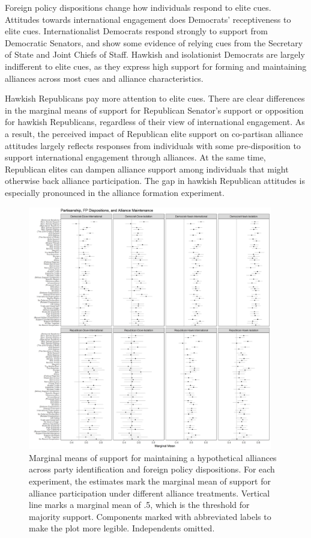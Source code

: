 \documentclass[12pt]{article}
\begin{document}
Foreign policy dispositions change how individuals respond to elite cues. 
Attitudes towards international engagement does Democrats' receptiveness to elite cues. 
Internationalist Democrats respond strongly to support from Democratic Senators, and show some evidence of relying cues from the Secretary of State and Joint Chiefs of Staff. 
Hawkish and isolationist Democrats are largely indifferent to elite cues, as they express high support for forming and maintaining alliances across most cues and alliance characteristics. 


Hawkish Republicans pay more attention to elite cues. 
There are clear differences in the marginal means of support for Republican Senator's support or opposition for hawkish Republicans, regardless of their view of international engagement. 
As a result, the perceived impact of Republican elite support on co-partisan alliance attitudes largely reflects responses from individuals with some pre-disposition to support international engagement through alliances. 
At the same time, Republican elites can dampen alliance support among individuals that might otherwise back alliance participation.
The gap in hawkish Republican attitudes is especially pronounced in the alliance formation experiment. 



\begin{figure}
	\centering
		\includegraphics[width=0.95\textwidth]{../figures/party-dispo-main.png}
	\caption{Marginal means of support for maintaining a hypothetical alliances across party identification and foreign policy dispositions. For each experiment, the estimates mark the marginal mean of support for alliance participation under different alliance treatments. Vertical line marks a marginal mean of .5, which is the threshold for majority support. Components marked with abbreviated labels to make the plot more legible. Independents omitted.}
	\label{fig:party-dispo-main}
\end{figure}
\end{document}
